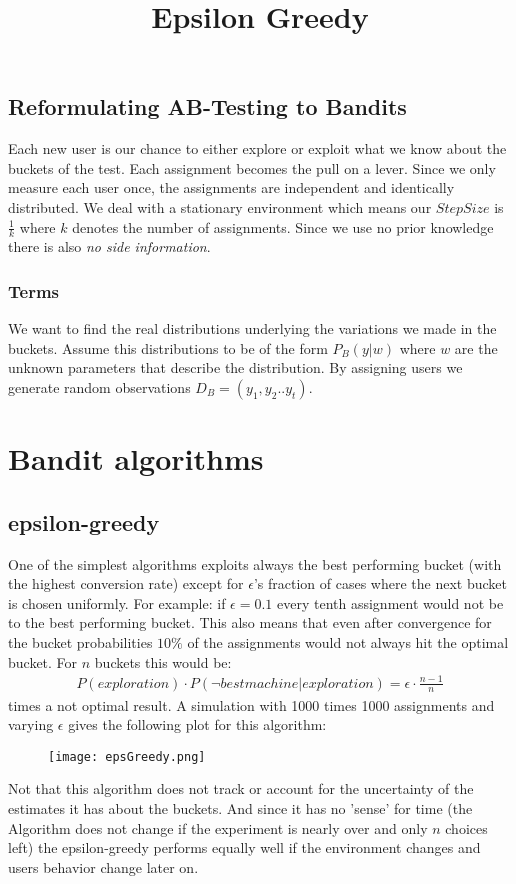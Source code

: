 \documentclass[main.tex]{subfiles}
\begin{document}
\subsection{Reformulating AB-Testing to Bandits}
Each new user is our chance to either explore or exploit what we know about the buckets of the test. Each assignment becomes the pull on a lever. Since we only measure each user once, the assignments are independent and identically distributed. We deal with a stationary environment which means our $StepSize$ is $\frac{1}{k}$ where $k$ denotes the number of assignments. Since we use no prior knowledge there is also \emph{no side information}. 
\subsubsection{Terms}
We want to find the real distributions underlying the variations we made in the buckets. Assume this distributions to be of the form $P_B(y|w)$ where $w$ are the unknown parameters that describe the distribution. By assigning users we generate random observations $D_B=(y_1,y_2..y_t)$.

\section{Bandit algorithms}
\subsection{epsilon-greedy}
One of the simplest algorithms exploits always the best performing bucket (with the highest conversion rate) except for $\epsilon $'s fraction of cases where the next bucket is chosen uniformly. For example: if $\epsilon = 0.1$ every tenth assignment would not be to the best performing bucket. This also means that even after convergence for the bucket probabilities $10\%$ of the assignments would not always hit the optimal bucket. For $n$ buckets this would be:
\begin{align*}
P(exploration) \cdot P(\neg best machine | exploration) = \epsilon \cdot \frac{n-1}{n}
\end{align*}
times a not optimal result. A simulation with 1000 times 1000 assignments and varying $\epsilon$ gives the following plot for this algorithm:
\begin{figure}[ht]
\texttt{[image: epsGreedy.png]}
\centering
\title{Epsilon Greedy}
\end{figure}
Not that this algorithm does not track or account for the uncertainty of the estimates it has about the buckets. And since it has no 'sense' for time (the Algorithm does not change if the experiment is nearly over and only $n$ choices left) the epsilon-greedy performs equally well if the environment changes and users behavior change later on.
\end{document}
